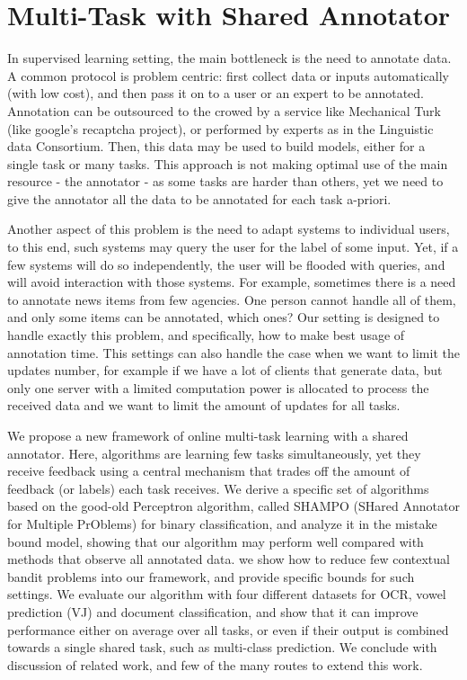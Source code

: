 \section{Multi-Task with Shared Annotator}
\label{sec:multi_task_intro}

 In supervised learning setting, the main bottleneck is the need to annotate data. A common protocol is 
 problem centric: first collect data or inputs automatically (with low cost), and then 
 pass it on to a user or an expert to be annotated. Annotation can be outsourced to the crowed by a 
 service like Mechanical Turk (like google's recaptcha project), or performed by experts as
  in the Linguistic data Consortium. Then, this data 
 may be used to build models, either for a single task or many tasks. This approach is not making optimal 
 use of the main resource - the annotator - as some tasks are harder than others, yet we need to give the 
 annotator all the data to be annotated for each task a-priori. 
 
 Another aspect of this problem is the need to adapt systems to individual users, to this end, 
 such systems may query the user for the label of some input. Yet, if a few systems will do so 
 independently, the user will be flooded with queries, and will avoid interaction with those systems. 
 For example, sometimes there is a need to annotate news items from few agencies. One person cannot 
 handle all of them, and only some items can be annotated, which ones? Our setting is designed to handle 
 exactly this problem, and specifically, how to make best usage of annotation time.
 This settings can also handle the case when we want to limit the updates number, 
 for example if we have a lot of clients that generate data, but only one server with a limited computation 
 power is allocated to process the received data and we want to limit the amount of updates for all tasks.
 
 We propose a new framework of online multi-task learning with a shared annotator. 
 Here, algorithms are learning few tasks simultaneously, yet they receive feedback using a central 
 mechanism that trades off the amount of feedback (or labels) each task receives. We derive a specific 
 set of algorithms based on the good-old Perceptron algorithm, called SHAMPO (SHared Annotator for Multiple 
 PrOblems) for binary classification, and analyze it in the mistake bound model, showing that our algorithm 
 may perform well compared with methods that observe all annotated data. we show how to reduce 
 few contextual bandit problems into our framework, and provide specific bounds for such 
settings. We evaluate our algorithm with four different datasets for OCR, vowel prediction (VJ) and 
document classification, and show that it can improve performance either on average over all tasks, 
or even if their output is combined towards a single shared task, such as multi-class prediction.
 We conclude with discussion of related work, and few of the many routes to extend this work.
